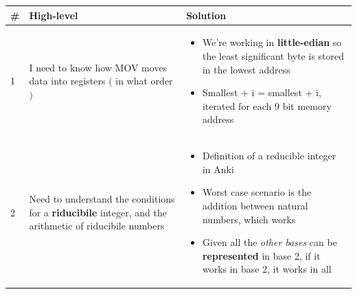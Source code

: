 \documentclass[a4paper,12pt]{article}
\begin{document}
\noindent\hspace*{-1.5cm}
    \begin{tabular}{|C{0.7cm}|C{8cm}|C{8cm}|}
        \hline
        \textbf{\#} & \textbf{High-level} & \textbf{Solution} \\
        
        \hline
        
        1 
        &
        I need to know how MOV moves data into registers $($ in what order $)$
        & 
        \begin{itemize}[label=\(\rightarrow\)]
            \item We're working in \textbf{little-edian} so the least significant byte is stored in the lowest address
            \item Smallest + i = smallest + i, iterated for each 9 bit memory address
        \end{itemize}   
        \\
        
        \hline


        2
        &
        Need to understand the conditions for a \textbf{riducibile} integer, and the arithmetic of riducibile numbers
        &
         \begin{itemize}[label=\(\rightarrow\)]
            \item Definition of a reducible integer in Anki 
            \item Worst case scenario is the addition between natural numbers, which works
            \item Given all the \textit{other bases} can be \textbf{represented} in base 2, if it works in base 2, it works in all 
        \end{itemize}   
        \\
        
        \hline

    \end{tabular}
\end{document}
